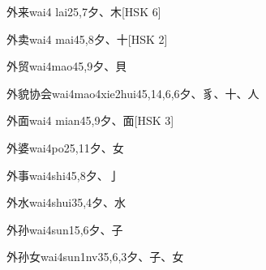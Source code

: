\begin{EntryWithPhonetic}{外来}{wai4 lai2}{5,7}{⼣、⽊}[HSK 6]
\end{EntryWithPhonetic}

\begin{EntryWithPhonetic}{外卖}{wai4 mai4}{5,8}{⼣、⼗}[HSK 2]
\end{EntryWithPhonetic}

\begin{EntryWithPhonetic}{外贸}{wai4mao4}{5,9}{⼣、⾙}
\end{EntryWithPhonetic}

\begin{EntryWithPhonetic}{外貌协会}{wai4mao4xie2hui4}{5,14,6,6}{⼣、⾘、⼗、⼈}
\end{EntryWithPhonetic}

\begin{EntryWithPhonetic}{外面}{wai4 mian4}{5,9}{⼣、⾯}[HSK 3]
\end{EntryWithPhonetic}

\begin{EntryWithPhonetic}{外婆}{wai4po2}{5,11}{⼣、⼥}
\end{EntryWithPhonetic}

\begin{EntryWithPhonetic}{外事}{wai4shi4}{5,8}{⼣、⼅}
\end{EntryWithPhonetic}

\begin{EntryWithPhonetic}{外水}{wai4shui3}{5,4}{⼣、⽔}
\end{EntryWithPhonetic}

\begin{EntryWithPhonetic}{外孙}{wai4sun1}{5,6}{⼣、⼦}
\end{EntryWithPhonetic}

\begin{EntryWithPhonetic}{外孙女}{wai4sun1nv3}{5,6,3}{⼣、⼦、⼥}
\end{EntryWithPhonetic}

